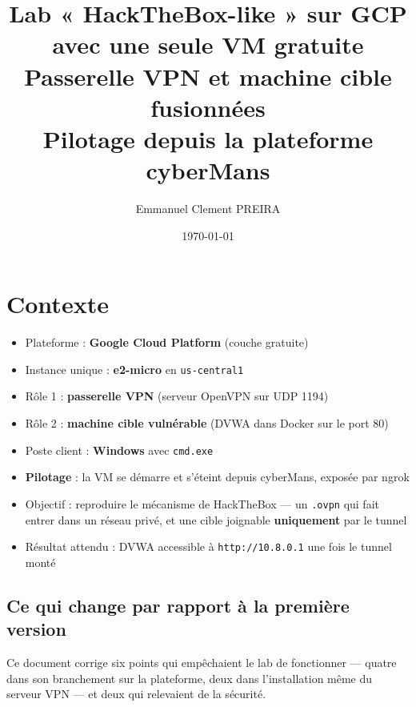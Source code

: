 \documentclass[a4paper,12pt]{article}
\title{Lab « HackTheBox-like » sur GCP \\ avec une seule VM gratuite \\
       \large Passerelle VPN et machine cible fusionnées \\
       \large Pilotage depuis la plateforme cyberMans}
\author{Emmanuel Clement PREIRA}
\date{\today}
\begin{document}
\maketitle
\tableofcontents
\newpage

\section{Contexte}
\label{sec:contexte}

\begin{itemize}
    \item Plateforme : \textbf{Google Cloud Platform} (couche gratuite)
    \item Instance unique : \textbf{e2-micro} en \texttt{us-central1}
    \item Rôle 1 : \textbf{passerelle VPN} (serveur OpenVPN sur UDP 1194)
    \item Rôle 2 : \textbf{machine cible vulnérable} (DVWA dans Docker sur le port 80)
    \item Poste client : \textbf{Windows} avec \texttt{cmd.exe}
    \item \textbf{Pilotage} : la VM se démarre et s'éteint depuis cyberMans, exposée par ngrok
    \item Objectif : reproduire le mécanisme de HackTheBox --- un \texttt{.ovpn} qui fait entrer dans un réseau privé, et une cible joignable \textbf{uniquement} par le tunnel
    \item Résultat attendu : DVWA accessible à \texttt{http://10.8.0.1} une fois le tunnel monté
\end{itemize}

\subsection{Ce qui change par rapport à la première version}
\label{sec:changements}

Ce document corrige six points qui empêchaient le lab de fonctionner --- quatre
dans son branchement sur la plateforme, deux dans l'installation même du serveur
VPN --- et deux qui relevaient de la sécurité.
\end{document}
